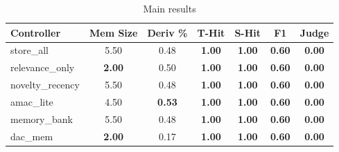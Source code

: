 \begin{table}[t]
\centering
\caption{Main results}
\label{tab:main}
\begin{tabular}{lcccccc}
\toprule
Controller & Mem Size & Deriv \% & T-Hit & S-Hit & F1 & Judge \\
\midrule
store\_all & 5.50 & 0.48 & \textbf{1.00} & \textbf{1.00} & \textbf{0.60} & \textbf{0.00} \\
relevance\_only & \textbf{2.00} & 0.50 & \textbf{1.00} & \textbf{1.00} & \textbf{0.60} & \textbf{0.00} \\
novelty\_recency & 5.50 & 0.48 & \textbf{1.00} & \textbf{1.00} & \textbf{0.60} & \textbf{0.00} \\
amac\_lite & 4.50 & \textbf{0.53} & \textbf{1.00} & \textbf{1.00} & \textbf{0.60} & \textbf{0.00} \\
memory\_bank & 5.50 & 0.48 & \textbf{1.00} & \textbf{1.00} & \textbf{0.60} & \textbf{0.00} \\
dac\_mem & \textbf{2.00} & 0.17 & \textbf{1.00} & \textbf{1.00} & \textbf{0.60} & \textbf{0.00} \\
\bottomrule
\end{tabular}
\end{table}